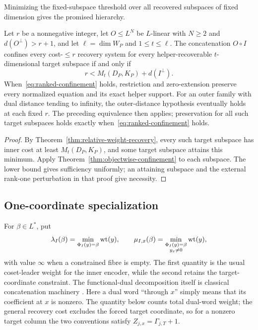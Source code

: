 Minimizing the fixed-subspace threshold over all recovered subspaces of fixed
dimension gives the promised hierarchy.

\begin{theorem}
\label{thm:ranked-confinement}
%
Let $r$ be a nonnegative integer, let $O\leq L^N$ be $L$-linear with
$N\geq2$ and $d(O^\perp)>r+1$, and let $\ell=\dim W_P$ and
$1\leq t\leq\ell$.  The concatenation $O\circ I$ confines every
cost-$\leq r$ recovery system for every helper-recoverable
$t$-dimensional target subspace if and only if
\begin{equation}
 r<M_t(D_P,K_P)+d(I^\perp).
 \label{eq:ranked-confinement}
\end{equation}
When~\eqref{eq:ranked-confinement} holds, restriction and zero-extension
preserve every normalized equation and its exact helper support.
For an outer family with dual distance tending to infinity, the outer-distance
hypothesis eventually holds at each fixed $r$.  The preceding equivalence then
applies; preservation for all such target subspaces holds exactly
when~\eqref{eq:ranked-confinement} holds.
\end{theorem}

\begin{proof}
By Theorem~\ref{thm:relative-weight-recovery}, every such target subspace
has inner cost at least $M_t(D_P,K_P)$, and some target subspace attains this
minimum.  Apply Theorem~\ref{thm:objectwise-confinement} to each subspace.
The lower bound gives sufficiency uniformly; an attaining subspace and the
external rank-one perturbation in that proof give necessity.
%
%
\end{proof}

\subsection{One-coordinate specialization}

For $\beta\in L^*$, put
\[
 \lambda_I(\beta)=\min_{\Phi_I(y)=\beta}\operatorname{wt}(y),
 \qquad
 \mu_{I,x}(\beta)=
 \min_{\substack{\Phi_I(y)=\beta\\y_x\neq0}}\operatorname{wt}(y),
\]
with value $\infty$ when a constrained fibre is empty.  The first quantity is
the usual coset-leader weight for the inner encoder, while the second retains
the target-coordinate constraint.  The functional-dual decomposition itself
is classical concatenation machinery
\cite[Theorem~2.1]{ChenLingXing2005}.
Here a dual word ``through $x$'' simply means that its coefficient at $x$ is
nonzero.  The quantity below counts total dual-word weight; the general
recovery cost excludes the forced target coordinate, so for a nonzero target
column the two conventions satisfy $Z_{j,x}=\Gamma_{j,T}+1$.

